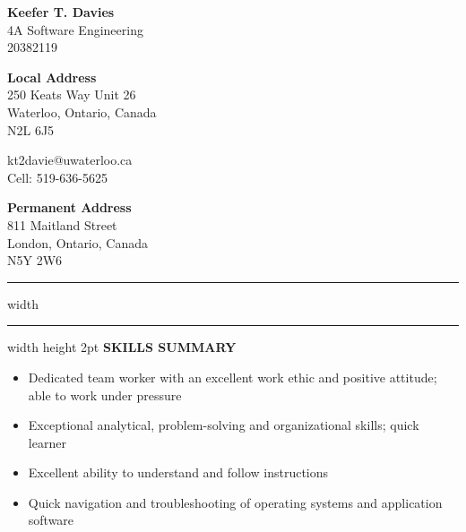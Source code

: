 \documentclass[10pt,letterpaper]{article}
\begin{document}
\begin{center}
    {\Large \textbf{Keefer T. Davies}}\\		
    4A Software Engineering\\
    20382119
\end{center}
\begin{minipage}{0.33\columnwidth}
    \textbf{Local Address}\\
    250 Keats Way Unit 26\\		
    Waterloo, Ontario, Canada\\		
    N2L 6J5
\end{minipage}
\begin{minipage}{0.33\columnwidth}
    \begin{center}
	kt2davie@uwaterloo.ca\\			
	Cell: 519-636-5625
    \end{center}
\end{minipage}
\begin{minipage}{0.33\columnwidth}
    \begin{adjustwidth}{0.25\columnwidth}{}
	{\textbf{Permanent Address}}\\			
	811 Maitland Street\\			
	London, Ontario, Canada\\			
	N5Y 2W6
    \end{adjustwidth}
\end{minipage}
\vspace{1em}
\hrule width \hsize \kern 1mm \hrule width \hsize height 2pt 
\vspace{1em}
\noindent \textbf{SKILLS SUMMARY} \hrulefill \\
\begin{adjustwidth}{0.1in}{0.5in}    
    \begin{itemize}
	\item Dedicated team worker with an excellent work ethic and positive attitude; able to work under pressure
	\item Exceptional analytical, problem-solving and organizational skills; quick learner
	\item Excellent ability to understand and follow instructions
	\item Quick navigation and troubleshooting of operating systems and application software
    \end{itemize}
\end{adjustwidth}
\vspace{1em}
\end{document}
